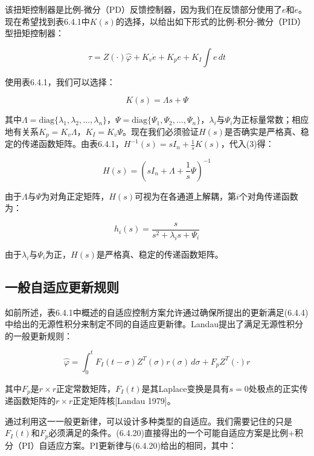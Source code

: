 \documentclass[12pt,a4paper]{ctexart}
\begin{document}
该扭矩控制器是比例-微分（PD）反馈控制器，因为我们在反馈部分使用了$e$和$\dot{e}$。现在希望找到表6.4.1中$K(s)$的选择，以给出如下形式的比例-积分-微分（PID）型扭矩控制器：

\begin{equation}
\tau = Z(\cdot)\hat{\varphi} + K_v\dot{e} + K_p e + K_I \int e\, dt \tag{2}
\end{equation}

使用表6.4.1，我们可以选择：

\begin{equation}
K(s) = \Lambda s + \Psi \tag{3}
\end{equation}

其中$\Lambda=\mathrm{diag}\{\lambda_1,\lambda_2,\ldots,\lambda_n\}$，$\Psi=\mathrm{diag}\{\Psi_1,\Psi_2,\ldots,\Psi_n\}$，$\lambda_i$与$\Psi_i$为正标量常数；相应地有关系$K_p=K_v\Lambda$，$K_I=K_v\Psi$。现在我们必须验证$H(s)$是否确实是严格真、稳定的传递函数矩阵。由表6.4.1，$H^{-1}(s)=sI_n+\frac{1}{s}K(s)$，代入(3)得：

\begin{equation}
H(s) = \left( sI_n + \Lambda + \frac{1}{s}\Psi \right)^{-1} \tag{4}
\end{equation}

由于$\Lambda$与$\Psi$为对角正定矩阵，$H(s)$可视为在各通道上解耦，第$i$个对角传递函数为：

\begin{equation}
h_i(s) = \frac{s}{s^2 + \lambda_i s + \Psi_i} \tag{5}
\end{equation}

由于$\lambda_i$与$\Psi_i$为正，$H(s)$是严格真、稳定的传递函数矩阵。

\subsection*{一般自适应更新规则}

如前所述，表6.4.1中概述的自适应控制方案允许通过确保所提出的更新满足(6.4.4)中给出的无源性积分来制定不同的自适应更新律。Landau提出了满足无源性积分的一般更新规则：

\begin{equation}\label{eq:6.4.20}
\hat{\varphi} = \int_0^t F_I(t-\sigma) Z^T(\sigma) r(\sigma)\,d\sigma + F_p Z^T(\cdot) r
\end{equation}

其中$F_p$是$r \times r$正定常数矩阵，$F_I(t)$是其Laplace变换是具有$s=0$处极点的正实传递函数矩阵的$r \times r$正定矩阵核[Landau 1979]。

通过利用这一一般更新律，可以设计多种类型的自适应。我们需要记住的只是$F_I(t)$和$F_p$必须满足的条件。(6.4.20)直接得出的一个可能自适应方案是比例+积分（PI）自适应方案。PI更新律与(6.4.20)给出的相同，其中：
\end{document}
